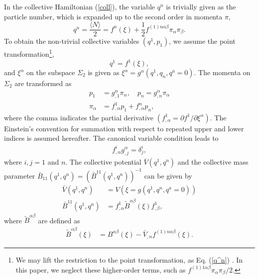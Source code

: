 \documentclass[%
superscriptaddress,
showpacs,
nofootinbib,
amsmath,amssymb,
aps,
prc,
twocolumn,
floatfix ]%
{revtex4-1}
\begin{document}
In the collective Hamiltonian (\ref{coll}), the variable $q^n$ is
trivially given as the particle number, which is expanded up to the
second order in momenta $\pi$,
\begin{equation}
q^n=\frac{\langle N \rangle}{2} = f^n(\xi)
	+\frac{1}{2}f^{(1)n\alpha\beta}\pi_\alpha\pi_\beta .
	\label{q^n}
\end{equation}
To obtain the non-trivial collective variables
$(q^1,p_1)$, we assume the point transformation\footnote{
We may lift the restriction to the point transformation,
as Eq. (\ref{q^n}) \cite{Sat18}.
In this paper, we neglect these higher-order terms, such as
$f^{(1)1\alpha\beta}\pi_\alpha\pi_\beta/2$.
},
\begin{equation}
  q^1 = f^1(\xi) \label{point} ,
\end{equation}
and $\xi^\alpha$ on the subspace $\Sigma_2$ is given as
$\xi^{\alpha} = g^{\alpha}(q^1,q_n,q^a=0)$.
The momenta on $\Sigma_2$ are transformed as
\begin{align}
p_1 &= g_{,1}^{\alpha}\pi_{\alpha} , \quad p_n = g_{,n}^\alpha \pi_\alpha
	\label{coll_momenta}\\
\pi_{\alpha} &= f^1_{,\alpha}p_1 +f^n_{,\alpha}p_n,
 \label{momenta}
\end{align}
where the comma indicates the partial derivative
$(f^1_{,\alpha}=\partial f^1/\partial \xi^{\alpha})$. 
The Einstein's convention for summation with respect to repeated
upper and lower indices is assumed hereafter.
The canonical variable condition leads to
\begin{align}
f^i_{,\alpha}g_{,j}^{\alpha} = \delta^i_j,
  \label{canonicity}
\end{align}
where $i,j=1$ and $n$.
The collective potential $\bar{V}(q^1,q^n)$ and
the collective mass parameter
$\bar{B}_{11}(q^1,q^n)=(\bar{B}^{11}(q^1,q^n))^{-1}$ can be given by
\begin{align}
\bar{V}(q^1,q^n) &= V(\xi=g(q^1,q^n,q^a=0)) \\
\bar{B}^{11}(q^1,q^n) &= f^1_{,\alpha}\tilde{B}^{\alpha\beta}(\xi)f^1_{,\beta} ,
  \label{coll_mass}
\end{align}
where $\tilde{B}^{\alpha\beta}$ are defined as
\begin{align}
 \tilde{B}^{\alpha\beta}(\xi)
&= B^{\alpha\beta}(\xi) - \bar{V}_{,n} f^{(1)n\alpha\beta}(\xi)
\label{tildeB}.
\end{align} 
\end{document}

